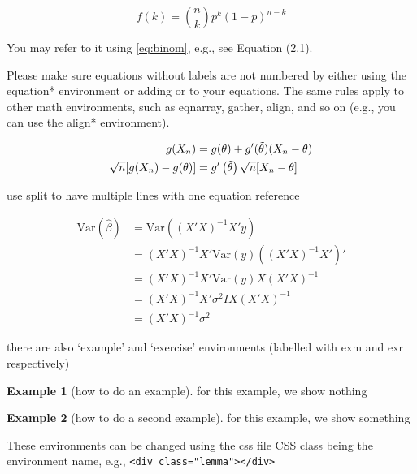 \documentclass[
]{book}
\theoremstyle{definition}
\theoremstyle{definition}
\newtheorem{example}{Example}[chapter]
\theoremstyle{definition}
\theoremstyle{remark}
\begin{document}
\begin{equation} 
  f\left(k\right) = \binom{n}{k} p^k\left(1-p\right)^{n-k}
  \label{eq:binom}
\end{equation}

You may refer to it using \eqref{eq:binom}, e.g., see Equation (2.1).

Please make sure equations  without labels are not numbered by either using the equation* environment or adding \nonumber or \notag to your equations. The same rules apply to other math environments, such as eqnarray, gather, align, and so on (e.g., you can use the align* environment).

\begin{align} 
g(X_{n}) & = g(\theta)+g'({\tilde{\theta}})(X_{n}-\theta) \notag \\
\sqrt{n}[g(X_{n})-g(\theta)] & = g'\left({\tilde{\theta}}\right) 
\sqrt{n}[X_{n}-\theta]\label{eq:align} \\
\end{align}

use split to have multiple lines with one equation reference

\begin{equation} 
\begin{split}
\mathrm{Var}(\hat{\beta}) & =\mathrm{Var}((X'X)^{-1}X'y)\\
 & =(X'X)^{-1}X'\mathrm{Var}(y)((X'X)^{-1}X')'\\
 & =(X'X)^{-1}X'\mathrm{Var}(y)X(X'X)^{-1}\\
 & =(X'X)^{-1}X'\sigma^{2}IX(X'X)^{-1}\\
 & =(X'X)^{-1}\sigma^{2}
\end{split}
\label{eq:var-beta}
\end{equation}

there are also `example' and `exercise' environments (labelled with exm and exr respectively)

\begin{example}[how to do an example]
\protect\hypertarget{exm:eg1}{}{\label{exm:eg1} \iffalse (how to do an example) \fi{} }
for this example, we show nothing
\end{example}

\begin{example}[how to do a second example]
\protect\hypertarget{exm:eg2}{}{\label{exm:eg2} \iffalse (how to do a second example) \fi{} }
for this example, we show something
\end{example}

These environments can be changed using the css file CSS class being the environment name, e.g., \texttt{\textless{}div\ class="lemma"\textgreater{}\textless{}/div\textgreater{}}
\end{document}
